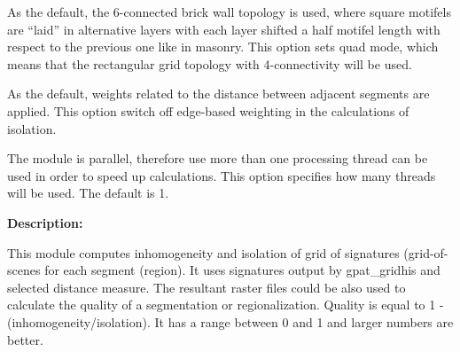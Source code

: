 As the default, the 6-connected brick wall topology is used, where square motifels are “laid” in alternative layers with each layer shifted a half motifel length with respect to the previous one like in masonry. 
This option sets quad mode, which means that the rectangular grid topology with 4-connectivity will be used. 


As the default, weights related to the distance between adjacent segments are applied.
This option switch off edge-based weighting in the calculations of isolation.


The module is parallel, therefore use more than one processing thread can be used in order to speed up calculations. 
This option specifies how many threads will be used. 
The default is 1.

{\bf Description:}

This module computes inhomogeneity and isolation of grid of signatures (grid-of-scenes for each segment (region).
It uses signatures output by gpat\_gridhis and selected distance measure.
The resultant raster files could be also used to calculate the quality of a segmentation or regionalization. 
Quality is equal to 1 - (inhomogeneity/isolation).
It has a range between 0 and 1 and larger numbers are better. 

